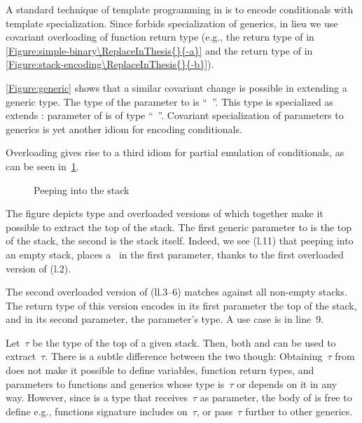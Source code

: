 A standard technique of template programming in \CC is to encode conditionals with template specialization.
Since \Java forbids specialization of generics, in lieu we use covariant overloading of function
return type (e.g., the return type of  in \cref{Figure:simple-binary\ReplaceInThesis{}{-a}} and the
  return type of  in \cref{Figure:stack-encoding\ReplaceInThesis{}{-b}}).

\cref{Figure:generic} shows that a similar covariant change is possible 
  in extending a generic type.
The type of the parameter  
  to  is ``\mbox{  }''.
This type is specialized as  extends :
  parameter  of  is of type  
  ``\mbox{  }''.
Covariant specialization of parameters to generics 
  is yet another idiom for encoding conditionals.

Overloading gives rise to a third idiom for partial emulation of conditionals, as can be seen
  in~\cref{Figure:peep}.

\begin{figure}[htb]%
  \caption{Peeping into the stack}%
  \label{Figure:peep}%
  \lstset{style=numbered}
\end{figure}

The figure depicts type  and overloaded versions of  which 
  together make it possible to extract the top of the stack.
The first generic parameter to  is the top of the stack, the second is the stack itself.
Indeed, we see (l.11) that peeping into an empty stack, places a~
  in the first parameter, thanks to the first overloaded version of  (l.2).

The second overloaded version of  (ll.3--6) matches
 against all non-empty stacks. 
The return type
 of this version encodes
 in its first parameter
 the top of the stack, and 
  in its second parameter, the parameter's type.
A use case is in line~9.

Let~$τ$ be the type of the top of a given stack.
Then, both  and  can be used to extract~$τ$.
There is a subtle difference between the two though:
Obtaining~$τ$ from  does
  not make it possible to define variables, function return types, and
  parameters to functions and generics whose type is~$τ$ or depends on it in any way.
However, since  is a type that receives~$τ$ as parameter,
  the body of  is free to define e.g., functions signature includes on~$τ$,
  or pass~$τ$ further to other generics.
